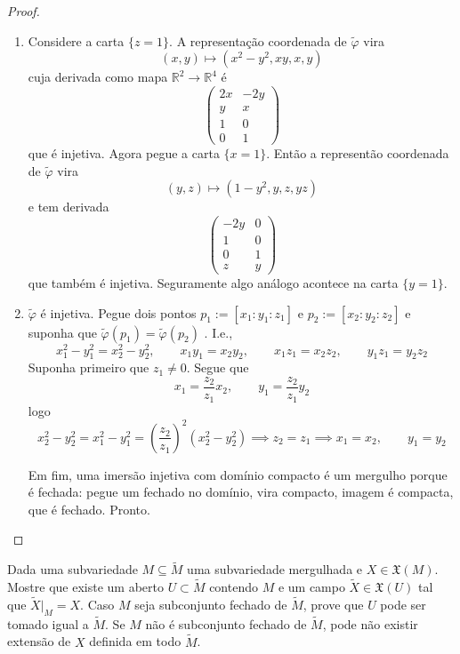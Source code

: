 \begin{proof}
\begin{enumerate}
\item Considere a carta \(\{z=1\}\). A
representação coordenada de
\(\tilde{\varphi}\) vira
\[(x,y) \longmapsto (x^2-y^2,xy,x,y)\]
cuja derivada como mapa \(\mathbb{R}^2 \to
\mathbb{R}^4\) é
\[\begin{pmatrix} 2x& -2y\\y&x\\1&0\\0&1
\end{pmatrix}\]
que é injetiva. Agora pegue a carta
\(\{x=1\}\). Então a representão coordenada
de \(\tilde{\varphi}\) vira
\[(y,z) \longmapsto (1-y^2,y,z,yz)\]
e tem derivada
\[\begin{pmatrix} -2y&0\\1&0\\0&1\\z&y
\end{pmatrix}\]
que também é injetiva. Seguramente algo
análogo acontece na carta \(\{y=1\}\).

\item \(\tilde{\varphi}\) é injetiva. Pegue
dois pontos \(p_1:=[x_1:y_1:z_1]\) e
\(p_2:=[x_2:y_2:z_2]\) e suponha que
\(\tilde{\varphi}(p_1)=\tilde{\varphi}(p_2)\)
.
I.e.,
\[x_1^2-y_1^2=x_2^2-y_2^2,\qquad
x_1y_1=x_2y_2,\qquad x_1z_1=x_2z_2,\qquad
y_1z_1=y_2z_2\]
Suponha primeiro que \(z_1 \neq 0\). Segue
que
\[x_1=\frac{z_2}{z_1}x_2,\qquad
y_1=\frac{z_2}{z_1}y_2\]
logo
\[x_2^2-y_2^2=x_1^2-y_1^2=
\left(\frac{z_2}{z_1}\right)^2(x_2^2-y_2^2)
\implies
z_2=z_1\implies x_1=x_2,\qquad y_1=y_2\]

\noindent
Em fim, uma imersão injetiva com domínio
compacto é um mergulho porque é fechada:
pegue um fechado no domínio, vira compacto,
imagem é compacta, que é fechado. Pronto.
\end{enumerate}
\end{proof}

\begin{exercise}
\label{exercise-extension-vector-fields}
Dada uma subvariedade \(M \subseteq
\tilde{M}\) uma subvariedade mergulhada e
\(X \in \mathfrak{X}(M)\). Mostre que existe
um aberto \(U \subset \tilde{M}\) contendo
\(M\) e um campo
\(\tilde{X} \in \mathfrak{X}(U)\) tal que
\(\tilde{X}|_{M}=X\).
Caso \(M\) seja subconjunto fechado de
\(\tilde{M}\), prove que \(U\) pode ser
tomado igual a \(\tilde{M}\). Se \(M\) não
é subconjunto fechado de \(\tilde{M}\),
pode não existir extensão de \(X\)
definida em todo \(\tilde{M}\).
\end{exercise}

